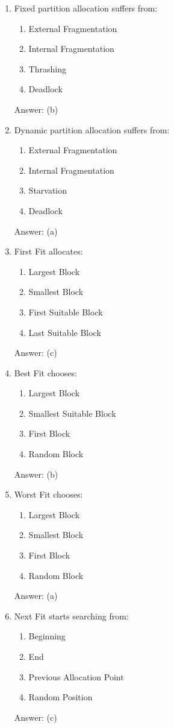 \begin{enumerate}
\item Fixed partition allocation suffers from:
\begin{enumerate}[label=(\alph*)]
\item External Fragmentation
\item Internal Fragmentation
\item Thrashing
\item Deadlock
\end{enumerate}
Answer: (b)

\item Dynamic partition allocation suffers from:
\begin{enumerate}[label=(\alph*)]
\item External Fragmentation
\item Internal Fragmentation
\item Starvation
\item Deadlock
\end{enumerate}
Answer: (a)

\item First Fit allocates:
\begin{enumerate}[label=(\alph*)]
\item Largest Block
\item Smallest Block
\item First Suitable Block
\item Last Suitable Block
\end{enumerate}
Answer: (c)

\item Best Fit chooses:
\begin{enumerate}[label=(\alph*)]
\item Largest Block
\item Smallest Suitable Block
\item First Block
\item Random Block
\end{enumerate}
Answer: (b)

\item Worst Fit chooses:
\begin{enumerate}[label=(\alph*)]
\item Largest Block
\item Smallest Block
\item First Block
\item Random Block
\end{enumerate}
Answer: (a)

\item Next Fit starts searching from:
\begin{enumerate}[label=(\alph*)]
\item Beginning
\item End
\item Previous Allocation Point
\item Random Position
\end{enumerate}
Answer: (c)


\end{enumerate}
